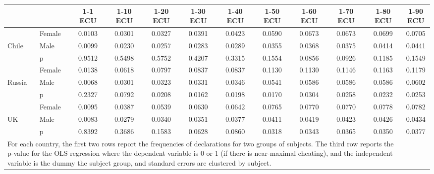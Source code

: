 \def\sym#1{\ifmmode^{#1}\else\(^{#1}\)\fi}
\begin{tabular}{|ll|cccccccccc|}
\hline\hline
&&1-1 ECU&1-10 ECU&1-20 ECU&1-30 ECU&1-40 ECU&1-50 ECU&1-60 ECU&1-70 ECU&1-80 ECU&1-90 ECU\\
\hline
&Female&   0.0103&   0.0301&   0.0327&   0.0391&   0.0423&   0.0590&   0.0673&   0.0673&   0.0699&   0.0705\\
Chile&Male&   0.0099&   0.0230&   0.0257&   0.0283&   0.0289&   0.0355&   0.0368&   0.0375&   0.0414&   0.0441\\
&p&   0.9512&   0.5498&   0.5752&   0.4207&   0.3315&   0.1554&   0.0856&   0.0926&   0.1185&   0.1549\\
\hline&Female&   0.0138&   0.0618&   0.0797&   0.0837&   0.0837&   0.1130&   0.1130&   0.1146&   0.1163&   0.1179\\
Russia&Male&   0.0068&   0.0301&   0.0323&   0.0331&   0.0346&   0.0541&   0.0586&   0.0586&   0.0586&   0.0602\\
&p&   0.2327&   0.0792&   0.0208&   0.0162&   0.0198&   0.0170&   0.0304&   0.0258&   0.0232&   0.0253\\
\hline&Female&   0.0095&   0.0387&   0.0539&   0.0630&   0.0642&   0.0765&   0.0770&   0.0770&   0.0778&   0.0782\\
UK&Male&   0.0083&   0.0279&   0.0340&   0.0351&   0.0377&   0.0411&   0.0419&   0.0423&   0.0426&   0.0434\\
&p&   0.8392&   0.3686&   0.1583&   0.0628&   0.0860&   0.0318&   0.0343&   0.0365&   0.0350&   0.0377\\
\hline\multicolumn{11}{p{15cm}}{\tiny For each country, the first two rows report the frequencies of declarations for two groups of subjects. The third row reports the p-value for the OLS regression where the dependent variable is 0 or 1 (if there is near-maximal cheating), and the independent variable is the dummy the subject group, and standard errors are clustered by subject. }\\
\end{tabular}